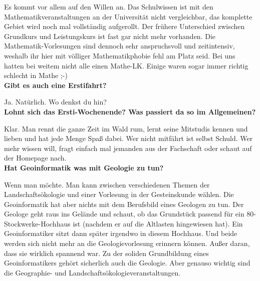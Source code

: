 Es kommt vor allem auf den Willen an. Das Schulwissen ist mit den Mathematikveranstaltungen an der Universität nicht vergleichbar, das komplette Gebiet wird noch mal vollständig aufgerollt. Der frühere Unterschied zwischen Grundkurs und Leistungskurs ist fast gar nicht mehr vorhanden. Die Mathematik-Vorlesungen sind dennoch sehr anspruchsvoll und zeitintensiv, weshalb ihr hier mit völliger Mathematikphobie fehl am Platz seid. Bei uns hatten bei weitem nicht alle einen Mathe-LK. Einige waren sogar immer richtig schlecht in Mathe ;-)\\

\textbf{Gibt es auch eine Erstifahrt?}

Ja. Natürlich. Wo denkst du hin?\\

\textbf{Lohnt sich das Ersti-Wochenende? Was passiert da so im Allgemeinen?}

Klar. Man rennt die ganze Zeit im Wald rum, lernt seine Mitstudis kennen und lieben und hat jede Menge Spaß dabei. Wer nicht mitfährt ist selbst Schuld. Wer mehr wissen will, fragt einfach mal jemanden aus der Fachschaft oder schaut auf der Homepage nach.\\





\textbf{Hat Geoinformatik was mit Geologie zu tun?}

Wenn man möchte. Man kann zwischen verschiedenen Themen der Landschaftsökologie und einer Vorlesung in der Gesteinskunde wählen. Die Geoinformatik hat aber nichts mit dem Berufsbild eines Geologen zu tun. Der Geologe geht raus ins Gelände und schaut, ob das Grundstück passend für ein 80-Stockwerke-Hochhaus ist (nachdem er auf die Altlasten hingewiesen hat). Ein Geoinformatiker sitzt dann später irgendwo in diesem Hochhaus. Und beide werden sich nicht mehr an die Geologievorlesung erinnern können. Außer daran, dass sie wirklich spannend war. Zu der soliden Grundbildung eines Geoinformatikers gehört sicherlich auch die Geologie. Aber genauso wichtig sind die Geographie- und Landschaftsökologieveranstaltungen.\\

